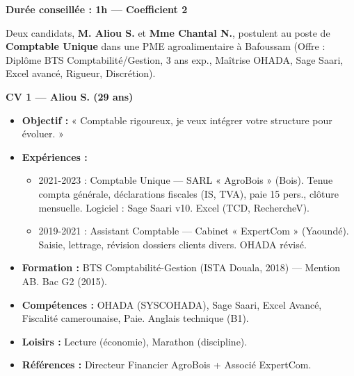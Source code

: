 \documentclass[11pt]{article}
\begin{document}
\begin{exercice}
\textbf{Durée conseillée : 1h — Coefficient 2}

Deux candidats, \textbf{M. Aliou S.} et \textbf{Mme Chantal N.}, postulent au poste de \textbf{Comptable Unique} dans une PME agroalimentaire à Bafoussam (Offre : Diplôme BTS Comptabilité/Gestion, 3 ans exp., Maîtrise OHADA, Sage Saari, Excel avancé, Rigueur, Discrétion).

\textbf{CV 1 — Aliou S. (29 ans)}
\begin{itemize}
\item \textbf{Objectif :} « Comptable rigoureux, je veux intégrer votre structure pour évoluer. »
\item \textbf{Expériences :}
  \begin{itemize}
  \item 2021-2023 : Comptable Unique — SARL « AgroBois » (Bois). Tenue compta générale, déclarations fiscales (IS, TVA), paie 15 pers., clôture mensuelle. Logiciel : Sage Saari v10. Excel (TCD, RechercheV).
  \item 2019-2021 : Assistant Comptable — Cabinet « ExpertCom » (Yaoundé). Saisie, lettrage, révision dossiers clients divers. OHADA révisé.
  \end{itemize}
\item \textbf{Formation :} BTS Comptabilité-Gestion (ISTA Douala, 2018) — Mention AB. Bac G2 (2015).
\item \textbf{Compétences :} OHADA (SYSCOHADA), Sage Saari, Excel Avancé, Fiscalité camerounaise, Paie. Anglais technique (B1).
\item \textbf{Loisirs :} Lecture (économie), Marathon (discipline).
\item \textbf{Références :} Directeur Financier AgroBois + Associé ExpertCom.
\end{itemize}


\end{exercice}
\end{document}
